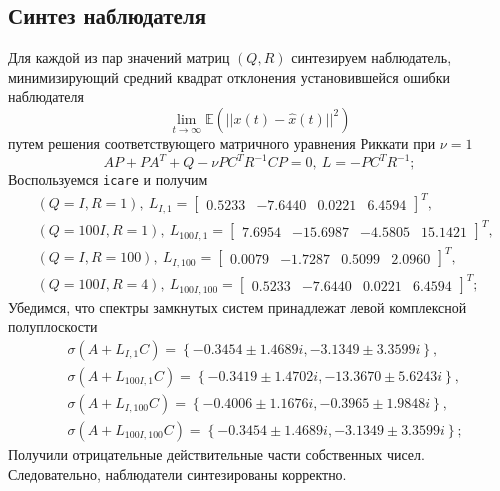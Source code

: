 \documentclass[a4paper, 12pt]{article}
\begin{document}
    \subsection{Синтез наблюдателя}
    Для каждой из пар значений матриц $\left( Q,R \right)$ синтезируем
    наблюдатель, минимизирующий средний квадрат отклонения установившейся ошибки наблюдателя
    $$
    \lim\limits_{t\to\infty}\mathbb{E}\left( ||x(t)-\hat{x}(t)||^2 \right)
    $$
    путем решения соответствующего матричного уравнения Риккати при $\nu=1$
    $$
    AP+PA^T+Q-\nu PC^TR^{-1}CP=0,\ L=-PC^TR^{-1};
    $$
    Воспользуемся \texttt{icare} и получим
    \begin{align*}
        &\left( Q=I, R=1 \right),\ L_{I,1}=\begin{bmatrix}
            0.5233  &-7.6440 &0.0221 &6.4594
        \end{bmatrix}^T,\\
        &\left( Q=100I, R=1 \right),\ L_{100I,1}=\begin{bmatrix}
            7.6954 &-15.6987 &-4.5805 &15.1421
        \end{bmatrix}^T,\\
        &\left( Q=I, R=100 \right),\ L_{I,100}=\begin{bmatrix}
            0.0079 &-1.7287 &0.5099 &2.0960
        \end{bmatrix}^T,\\
        &\left( Q=100I, R=4 \right),\ L_{100I,100}=\begin{bmatrix}
            0.5233  &-7.6440 &0.0221 &6.4594
        \end{bmatrix}^T;
    \end{align*}
    Убедимся, что спектры замкнутых систем принадлежат левой комплексной полуплоскости
    \begin{align*}
        &\sigma\left( A+L_{I,1}C \right)=\left\{ -0.3454\pm1.4689i, -3.1349\pm3.3599i \right\},\\
        &\sigma\left( A+L_{100I,1}C \right)=\left\{ -0.3419\pm1.4702i, -13.3670\pm5.6243i \right\},\\
        &\sigma\left( A+L_{I,100}C \right)=\left\{ -0.4006\pm1.1676i,-0.3965\pm1.9848i \right\},\\
        &\sigma\left( A+L_{100I,100}C \right)=\left\{ -0.3454\pm1.4689i, -3.1349\pm3.3599i \right\};
    \end{align*}
    Получили отрицательные действительные части собственных чисел.
    Следовательно, наблюдатели синтезированы корректно.
\end{document}
